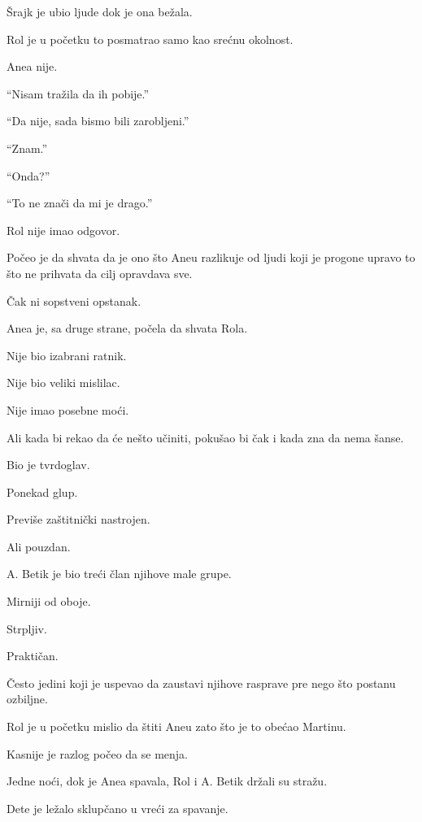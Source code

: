 Šrajk je ubio ljude dok je ona bežala.

Rol je u početku to posmatrao samo kao srećnu okolnost.

Anea nije.

``Nisam tražila da ih pobije.''

``Da nije, sada bismo bili zarobljeni.''

``Znam.''

``Onda?''

``To ne znači da mi je drago.''

\bigskip

Rol nije imao odgovor.

\bigskip

Počeo je da shvata da je ono što Aneu razlikuje od ljudi koji je progone upravo to što ne prihvata da cilj opravdava sve.

Čak ni sopstveni opstanak.

\bigskip

Anea je, sa druge strane, počela da shvata Rola.

Nije bio izabrani ratnik.

Nije bio veliki mislilac.

Nije imao posebne moći.

Ali kada bi rekao da će nešto učiniti, pokušao bi čak i kada zna da nema šanse.

\bigskip

Bio je tvrdoglav.

Ponekad glup.

Previše zaštitnički nastrojen.

Ali pouzdan.

\bigskip

A. Betik je bio treći član njihove male grupe.

Mirniji od oboje.

Strpljiv.

Praktičan.

Često jedini koji je uspevao da zaustavi njihove rasprave pre nego što postanu ozbiljne.

\bigskip

Rol je u početku mislio da štiti Aneu zato što je to obećao Martinu.

Kasnije je razlog počeo da se menja.

\bigskip

Jedne noći, dok je Anea spavala, Rol i A. Betik držali su stražu.

Dete je ležalo sklupčano u vreći za spavanje.

